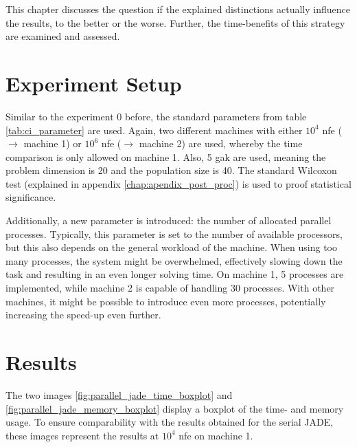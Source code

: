 \documentclass[./\jobname.tex]{subfiles}
\begin{document}
This chapter discusses the question if the explained distinctions actually influence the results, to the better or the worse. Further, the time-benefits of this strategy are examined and assessed.

\section{Experiment Setup}
Similar to the experiment 0 before, the standard parameters from table \ref{tab:ci_parameter} are used. Again, two different machines with either $10^4$ \gls{nfe} ($\rightarrow$ machine 1) or $10^6$ \gls{nfe} ($\rightarrow$ machine 2) are used, whereby the time comparison is only allowed on machine 1. Also, 5 \gls{gak} are used, meaning the problem dimension is 20 and the population size is 40. The standard Wilcoxon test (explained in appendix \ref{chap:apendix_post_proc}) is used to proof statistical significance. 

Additionally, a new parameter is introduced: the number of allocated parallel processes. Typically, this parameter is set to the number of available processors, but this also depends on the general workload of the machine. When using too many processes, the system might be overwhelmed, effectively slowing down the task and resulting in an even longer solving time. On machine 1, 5 processes are implemented, while machine 2 is capable of handling 30 processes. With other machines, it might be possible to introduce even more processes, potentially increasing the speed-up even further. 

\section{Results}

The two images \ref{fig:parallel_jade_time_boxplot} and \ref{fig:parallel_jade_memory_boxplot} display a boxplot of the time- and memory usage. To ensure comparability with the results obtained for the serial JADE, these images represent the results at $10^4$ \gls{nfe} on machine 1. 
\end{document}
